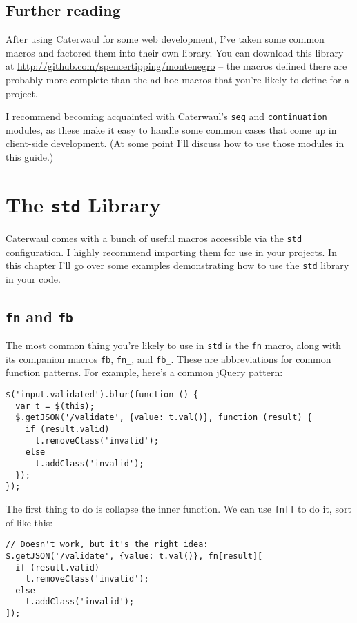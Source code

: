 \documentclass{report}
\begin{document}
\section{Further reading}\label{sec:introduction-further-reading}
    After using Caterwaul for some web development, I've taken some common macros and factored them into their own library. You can download this library at
    \url{http://github.com/spencertipping/montenegro} -- the macros defined there are probably more complete than the ad-hoc macros that you're likely to define for a project.

    I recommend becoming acquainted with Caterwaul's {\tt seq} and {\tt continuation} modules, as these make it easy to handle some common cases that come up in client-side development. (At
    some point I'll discuss how to use those modules in this guide.)
\chapter{The {\tt std} Library}\label{sec:the-std-library}
  Caterwaul comes with a bunch of useful macros accessible via the {\tt std} configuration. I highly recommend importing them for use in your projects. In this chapter I'll go over some
  examples demonstrating how to use the {\tt std} library in your code.

\section{{\tt fn} and {\tt fb}}\label{sec:the-std-library-fn}
    The most common thing you're likely to use in {\tt std} is the {\tt fn} macro, along with its companion macros {\tt fb}, \verb|fn_|, and \verb|fb_|. These are abbreviations for common
    function patterns. For example, here's a common jQuery pattern:

\begin{verbatim}
$('input.validated').blur(function () {
  var t = $(this);
  $.getJSON('/validate', {value: t.val()}, function (result) {
    if (result.valid)
      t.removeClass('invalid');
    else
      t.addClass('invalid');
  });
});
\end{verbatim}

    The first thing to do is collapse the inner function. We can use {\tt fn[]} to do it, sort of like this:

\begin{verbatim}
// Doesn't work, but it's the right idea:
$.getJSON('/validate', {value: t.val()}, fn[result][
  if (result.valid)
    t.removeClass('invalid');
  else
    t.addClass('invalid');
]);
\end{verbatim}
\end{document}
